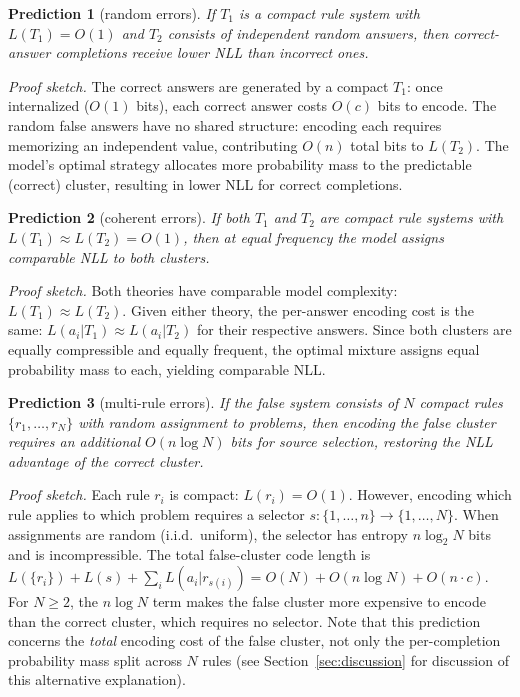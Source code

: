 \documentclass{article}
\begin{document}
\textbf{Prediction 1} (random errors). \emph{If $T_1$ is a compact rule system with $L(T_1) = O(1)$ and $T_2$ consists of independent random answers, then correct-answer completions receive lower NLL than incorrect ones.}

\emph{Proof sketch.} The correct answers are generated by a compact $T_1$: once internalized ($O(1)$ bits), each correct answer costs $O(c)$ bits to encode. The random false answers have no shared structure: encoding each requires memorizing an independent value, contributing $O(n)$ total bits to $L(T_2)$. The model's optimal strategy allocates more probability mass to the predictable (correct) cluster, resulting in lower NLL for correct completions.

\textbf{Prediction 2} (coherent errors). \emph{If both $T_1$ and $T_2$ are compact rule systems with $L(T_1) \approx L(T_2) = O(1)$, then at equal frequency the model assigns comparable NLL to both clusters.}

\emph{Proof sketch.} Both theories have comparable model complexity: $L(T_1) \approx L(T_2)$. Given either theory, the per-answer encoding cost is the same: $L(a_i|T_1) \approx L(a_i|T_2)$ for their respective answers. Since both clusters are equally compressible and equally frequent, the optimal mixture assigns equal probability mass to each, yielding comparable NLL.

\textbf{Prediction 3} (multi-rule errors). \emph{If the false system consists of $N$ compact rules $\{r_1, \ldots, r_N\}$ with random assignment to problems, then encoding the false cluster requires an additional $O(n \log N)$ bits for source selection, restoring the NLL advantage of the correct cluster.}

\emph{Proof sketch.} Each rule $r_i$ is compact: $L(r_i) = O(1)$. However, encoding which rule applies to which problem requires a selector $s: \{1,\ldots,n\} \to \{1,\ldots,N\}$. When assignments are random (i.i.d.\ uniform), the selector has entropy $n \log_2 N$ bits and is incompressible. The total false-cluster code length is $L(\{r_i\}) + L(s) + \sum_i L(a_i|r_{s(i)}) = O(N) + O(n \log N) + O(n \cdot c)$. For $N \geq 2$, the $n \log N$ term makes the false cluster more expensive to encode than the correct cluster, which requires no selector. Note that this prediction concerns the \emph{total} encoding cost of the false cluster, not only the per-completion probability mass split across $N$ rules (see Section~\ref{sec:discussion} for discussion of this alternative explanation).
\end{document}
